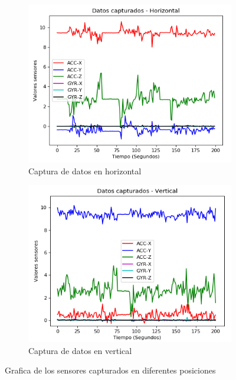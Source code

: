 \begin{figure}
        \centering
        \begin{subfigure}[h]{0.47\textwidth} 
            \includegraphics[width=\textwidth]{imagenes/horizontal}
            \caption{Captura de datos en horizontal}
            \label{fig:hor}
        \end{subfigure}       
        \begin{subfigure}[h]{0.47\textwidth} 
            \includegraphics[width=\textwidth]{imagenes/vertical}
            \caption{Captura de datos en vertical}
            \label{fig:ver}
        \end{subfigure}
        \caption{Grafica de los sensores capturados en diferentes posiciones}
        		\label{fig:verHor}
    \end{figure}

